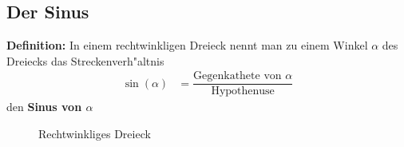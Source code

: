 \documentclass{standalone}
\begin{document}
\subsection{Der Sinus}

\textbf{Definition:} In einem rechtwinkligen Dreieck nennt man zu einem Winkel $\alpha$ des Dreiecks das Streckenverh{"a}ltnis
\begin{align}
  \sin(\alpha) & = \dfrac{\text{Gegenkathete von $\alpha$}}{\text{Hypothenuse}}
\end{align}
den \textbf{Sinus von $\alpha$}
\begin{figure}[hb!]
  \centering
  \def\svgwidth{200px}
  
  \caption{Rechtwinkliges Dreieck}
  \label{fig:rechtwinkliges_dreieck_sinus}
\end{figure}
\end{document}
